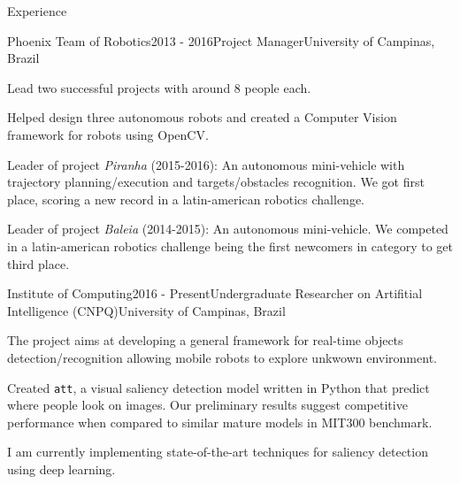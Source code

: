 \documentclass[8pt]{resume} %
\newcommand{\tit}[1]{\textit{#1}}
\newcommand{\ttt}[1]{\texttt{#1}}
\begin{document}


\begin{rSection}{Experience}

\begin{rSubsection}{Phoenix Team of Robotics}{2013 - 2016}{Project Manager}{University of Campinas, Brazil}
    \item Lead two successful projects with around 8 people each.
    \item Helped design three autonomous robots and
        created a Computer Vision framework for robots using OpenCV.
    \item Leader of project \tit{Piranha} (2015-2016):
        An autonomous mini-vehicle with trajectory planning/execution
        and targets/obstacles recognition.
        We got first place, scoring a new record in a latin-american
        robotics challenge.
    \item Leader of project \tit{Baleia} (2014-2015):
        An autonomous mini-vehicle.
        We competed in a latin-american robotics challenge
        being the first newcomers in category to get third place.
\end{rSubsection}


\begin{rSubsection}{Institute of Computing}{2016 - Present}{Undergraduate Researcher on Artifitial Intelligence (CNPQ)}{University of Campinas, Brazil}
    \item The project aims at developing a general framework for real-time
        objects detection/recognition allowing mobile robots to explore
        unkwown environment.
    \item Created \ttt{att}, a visual saliency detection model written in
        Python that predict where people look on images.
        Our preliminary results suggest competitive performance when compared
        to similar mature models in MIT300 benchmark.
    \item I am currently implementing state-of-the-art techniques for
        saliency detection using deep learning.
\end{rSubsection}


\end{rSection}
\end{document}
